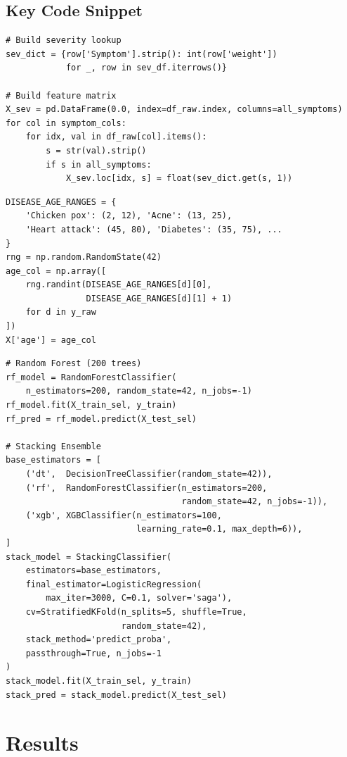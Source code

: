 \documentclass[12pt,a4paper]{article}
\begin{document}
\subsection{Key Code Snippet}

\begin{lstlisting}[caption=Severity-Weighted Feature Construction]
# Build severity lookup
sev_dict = {row['Symptom'].strip(): int(row['weight'])
            for _, row in sev_df.iterrows()}

# Build feature matrix
X_sev = pd.DataFrame(0.0, index=df_raw.index, columns=all_symptoms)
for col in symptom_cols:
    for idx, val in df_raw[col].items():
        s = str(val).strip()
        if s in all_symptoms:
            X_sev.loc[idx, s] = float(sev_dict.get(s, 1))
\end{lstlisting}

\begin{lstlisting}[caption=Age Feature Generation]
DISEASE_AGE_RANGES = {
    'Chicken pox': (2, 12), 'Acne': (13, 25),
    'Heart attack': (45, 80), 'Diabetes': (35, 75), ...
}
rng = np.random.RandomState(42)
age_col = np.array([
    rng.randint(DISEASE_AGE_RANGES[d][0],
                DISEASE_AGE_RANGES[d][1] + 1)
    for d in y_raw
])
X['age'] = age_col
\end{lstlisting}

\begin{lstlisting}[caption=Random Forest and Stacking Ensemble Training]
# Random Forest (200 trees)
rf_model = RandomForestClassifier(
    n_estimators=200, random_state=42, n_jobs=-1)
rf_model.fit(X_train_sel, y_train)
rf_pred = rf_model.predict(X_test_sel)

# Stacking Ensemble
base_estimators = [
    ('dt',  DecisionTreeClassifier(random_state=42)),
    ('rf',  RandomForestClassifier(n_estimators=200,
                                   random_state=42, n_jobs=-1)),
    ('xgb', XGBClassifier(n_estimators=100,
                          learning_rate=0.1, max_depth=6)),
]
stack_model = StackingClassifier(
    estimators=base_estimators,
    final_estimator=LogisticRegression(
        max_iter=3000, C=0.1, solver='saga'),
    cv=StratifiedKFold(n_splits=5, shuffle=True,
                       random_state=42),
    stack_method='predict_proba',
    passthrough=True, n_jobs=-1
)
stack_model.fit(X_train_sel, y_train)
stack_pred = stack_model.predict(X_test_sel)
\end{lstlisting}

\section{Results}
\end{document}
